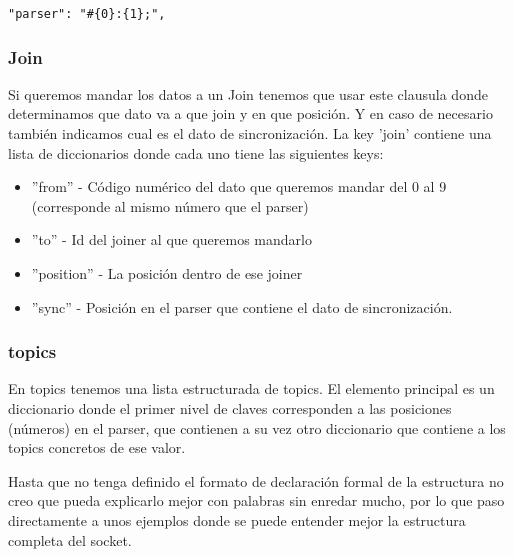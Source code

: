 \documentclass[12pt, a4paper, oneside, titlepage]{article}
\begin{document}
\begin{lstlisting} 
"parser": "#{0}:{1};",
\end{lstlisting}
				
 \subsubsection{Join}
Si queremos mandar los datos a un Join tenemos que usar este clausula donde determinamos que dato va a que join y en que posición. Y en caso de necesario también indicamos cual es el dato de sincronización. La key 'join' contiene una lista de diccionarios donde cada uno tiene las siguientes keys:
\begin{itemize}
\item ''from'' - Código numérico del dato que queremos mandar del 0 al 9 (corresponde al mismo número que el parser)
\item ''to'' - Id del joiner al que queremos mandarlo
\item ''position'' - La posición dentro de ese joiner
\item ''sync'' - Posición en el parser que contiene el dato de sincronización.
\end{itemize}
 \subsubsection{topics}
 En topics tenemos una lista estructurada de topics. El elemento principal es un diccionario donde el primer nivel de claves corresponden a las posiciones (números) en el parser, que contienen a su vez otro diccionario que contiene a los topics concretos de ese valor.
 
 Hasta que no tenga definido el formato de declaración formal de la estructura no creo que pueda explicarlo mejor con palabras sin enredar mucho, por lo que paso directamente a unos ejemplos donde se puede entender mejor la estructura completa del socket.
\end{document}
